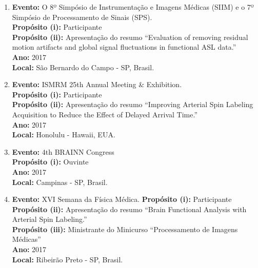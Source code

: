 \documentclass[a4paper,oneside,10pt]{article}
\begin{document}
\begin{enumerate}
        \item   \textbf{Evento:} O 8º Simpósio de Instrumentação e Imagens Médicas (SIIM) e o 7º Simpósio de Processamento de Sinais (SPS). \mbox{} \\
        \textbf{Propósito (i):} Participante \\
        \textbf{Propósito (ii):} Apresentação do resumo ``Evaluation of removing residual motion artifacts and global signal fluctuations in functional ASL data.''\\
        \textbf{Ano:} 2017\\
        \textbf{Local:} São Bernardo do Campo - SP, Brasil.

        \item   \textbf{Evento:} ISMRM 25th Annual Meeting \& Exhibition. \mbox{} \\
        \textbf{Propósito (i):} Participante \\
        \textbf{Propósito (ii):} Apresentação do resumo ``Improving Arterial Spin Labeling Acquisition to Reduce the Effect of Delayed Arrival Time.''\\
        \textbf{Ano:} 2017\\
        \textbf{Local:} Honolulu - Hawaii, EUA.

        \item   \textbf{Evento:} 4th BRAINN Congress \mbox{} \\
        \textbf{Propósito (i):} Ouvinte\\
        \textbf{Ano:} 2017\\
        \textbf{Local:} Campinas - SP, Brasil.

        \item   \textbf{Evento:} XVI Semana da Física Médica. 
        \textbf{Propósito (i):} Participante\\
        \textbf{Propósito (ii):} Apresentação do resumo ``Brain Functional Analysis with Arterial Spin Labeling.'' \mbox{} \\
        \textbf{Propósito (iii):} Ministrante do Minicurso ``Processamento de Imagens Médicas'' \mbox{} \\
        \textbf{Ano:} 2017\\
        \textbf{Local:} Ribeirão Preto - SP, Brasil.


\end{enumerate}
\end{document}
